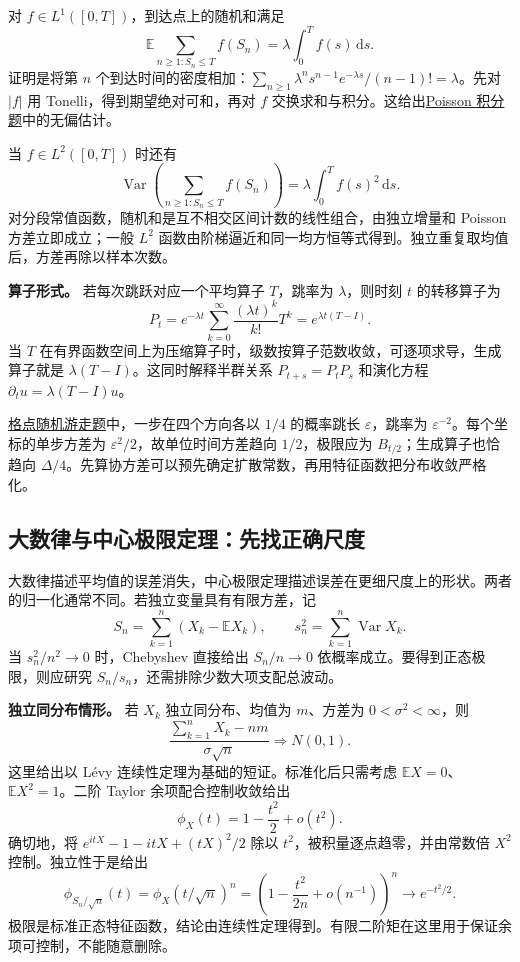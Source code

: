 \documentclass[UTF8,12pt,a4paper,fontset=fandol]{ctexbook}
\begin{document}
对 $f\in L^1([0,T])$，到达点上的随机和满足
\[
\mathbb E\sum_{n\ge1:S_n\le T}f(S_n)=\lambda\int_0^Tf(s)\,\mathrm ds.
\]
证明是将第 $n$ 个到达时间的密度相加：$\sum_{n\ge1}\lambda^ns^{n-1}e^{-\lambda s}/(n-1)!=\lambda$。先对 $|f|$ 用 Tonelli，得到期望绝对可和，再对 $f$ 交换求和与积分。这给出\hyperref[pr:fin14-high:12]{Poisson 积分题}中的无偏估计。

当 $f\in L^2([0,T])$ 时还有
\[
\operatorname{Var}\!\left(\sum_{n\ge1:S_n\le T}f(S_n)\right)
=\lambda\int_0^Tf(s)^2\,\mathrm ds.
\]
对分段常值函数，随机和是互不相交区间计数的线性组合，由独立增量和 Poisson 方差立即成立；一般 $L^2$ 函数由阶梯逼近和同一均方恒等式得到。独立重复取均值后，方差再除以样本次数。

\textbf{算子形式。} 若每次跳跃对应一个平均算子 $T$，跳率为 $\lambda$，则时刻 $t$ 的转移算子为
\[
P_t=e^{-\lambda t}\sum_{k=0}^\infty\frac{(\lambda t)^k}{k!}T^k
=e^{\lambda t(T-I)}.
\]
当 $T$ 在有界函数空间上为压缩算子时，级数按算子范数收敛，可逐项求导，生成算子就是 $\lambda(T-I)$。这同时解释半群关系 $P_{t+s}=P_tP_s$ 和演化方程 $\partial_tu=\lambda(T-I)u$。

\hyperref[pr:fin15-high:12]{格点随机游走题}中，一步在四个方向各以 $1/4$ 的概率跳长 $\varepsilon$，跳率为 $\varepsilon^{-2}$。每个坐标的单步方差为 $\varepsilon^2/2$，故单位时间方差趋向 $1/2$，极限应为 $B_{t/2}$；生成算子也恰趋向 $\Delta/4$。先算协方差可以预先确定扩散常数，再用特征函数把分布收敛严格化。

\subsection{大数律与中心极限定理：先找正确尺度}

\label{app:probability-limit}

大数律描述平均值的误差消失，中心极限定理描述误差在更细尺度上的形状。两者的归一化通常不同。若独立变量具有有限方差，记
\[
S_n=\sum_{k=1}^n(X_k-\mathbb EX_k),\qquad
s_n^2=\sum_{k=1}^n\operatorname{Var}X_k.
\]
当 $s_n^2/n^2\to0$ 时，Chebyshev 直接给出 $S_n/n\to0$ 依概率成立。要得到正态极限，则应研究 $S_n/s_n$，还需排除少数大项支配总波动。

\textbf{独立同分布情形。} 若 $X_k$ 独立同分布、均值为 $m$、方差为 $0<\sigma^2<\infty$，则
\[
\frac{\sum_{k=1}^nX_k-nm}{\sigma\sqrt n}\Rightarrow N(0,1).
\]
这里给出以 Lévy 连续性定理为基础的短证。标准化后只需考虑 $\mathbb EX=0$、$\mathbb EX^2=1$。二阶 Taylor 余项配合控制收敛给出
\[
\phi_X(t)=1-\frac{t^2}{2}+o(t^2).
\]
确切地，将 $e^{itX}-1-itX+(tX)^2/2$ 除以 $t^2$，被积量逐点趋零，并由常数倍 $X^2$ 控制。独立性于是给出
\[
\phi_{S_n/\sqrt n}(t)
=\phi_X(t/\sqrt n)^n
=\left(1-\frac{t^2}{2n}+o(n^{-1})\right)^n
\longrightarrow e^{-t^2/2}.
\]
极限是标准正态特征函数，结论由连续性定理得到。有限二阶矩在这里用于保证余项可控制，不能随意删除。
\end{document}
